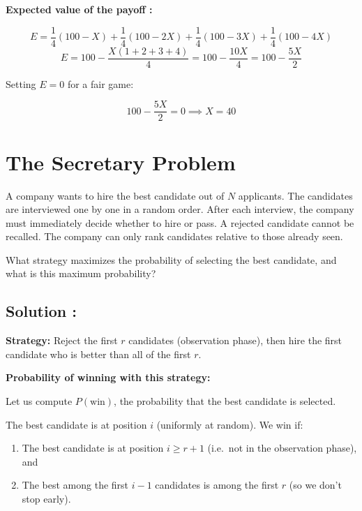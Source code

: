 \bigskip

\textbf{Expected value  of the payoff  :}  

\[
E = \frac{1}{4}(100 - X) + \frac{1}{4}(100 - 2X) + \frac{1}{4}(100 - 3X) + \frac{1}{4}(100 - 4X)
\]
\[
E = 100 - \frac{X(1+2+3+4)}{4} = 100 - \frac{10X}{4} = 100 - \frac{5X}{2}
\]

Setting $E = 0$ for a fair game:

\[
100 - \frac{5X}{2} = 0 \implies \boxed{X = 40}
\]



\section{The Secretary Problem}

\begin{exerciseBox}
A company wants to hire the best candidate out of $N$ applicants. The candidates are interviewed one by one in a random order. After each interview, the company must immediately decide whether to hire or pass. A rejected candidate cannot be recalled. The company can only rank candidates relative to those already seen.

What strategy maximizes the probability of selecting the best candidate, and what is this maximum probability?
\end{exerciseBox}



\subsection*{Solution :}

\textbf{Strategy:} Reject the first $r$ candidates (observation phase), then hire the first candidate who is better than all of the first $r$.

\bigskip

\textbf{Probability of winning with this strategy:}

Let us compute $P(\text{win})$, the probability that the best candidate is selected.

The best candidate is at position $i$ (uniformly at random). We win if:
\begin{enumerate}
    \item The best candidate is at position $i \geq r+1$ (i.e.\ not in the observation phase), and
    \item The best among the first $i-1$ candidates is among the first $r$ (so we don't stop early).
\end{enumerate}

